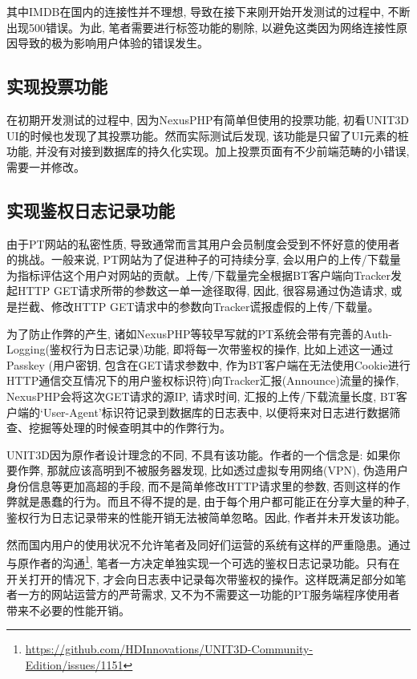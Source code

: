 其中IMDB在国内的连接性并不理想, 导致在接下来刚开始开发测试的过程中, 不断出现500错误。为此, 笔者需要进行标签功能的剔除, 以避免这类因为网络连接性原因导致的极为影响用户体验的错误发生。

\subsection{实现投票功能}

在初期开发测试的过程中, 因为NexusPHP有简单但使用的投票功能, 初看UNIT3D UI的时候也发现了其投票功能。然而实际测试后发现, 该功能是只留了UI元素的桩功能, 并没有对接到数据库的持久化实现。加上投票页面有不少前端范畴的小错误, 需要一并修改。

\subsection{实现鉴权日志记录功能}
\label{subsec:auth}

由于PT网站的私密性质, 导致通常而言其用户会员制度会受到不怀好意的使用者的挑战。一般来说, PT网站为了促进种子的可持续分享, 会以用户的上传/下载量为指标评估这个用户对网站的贡献。上传/下载量完全根据BT客户端向Tracker发起HTTP GET请求所带的参数这一单一途径取得, 因此, 很容易通过伪造请求, 或是拦截、修改HTTP GET请求中的参数向Tracker谎报虚假的上传/下载量。

为了防止作弊的产生, 诸如NexusPHP等较早写就的PT系统会带有完善的Auth-Logging(鉴权行为日志记录)功能, 即将每一次带鉴权的操作, 比如上述这一通过Passkey (用户密钥, 包含在GET请求参数中, 作为BT客户端在无法使用Cookie进行HTTP通信交互情况下的用户鉴权标识符)向Tracker汇报(Announce)流量的操作, NexusPHP会将这次GET请求的源IP, 请求时间, 汇报的上传/下载流量长度, BT客户端的`User-Agent'标识符记录到数据库的日志表中, 以便将来对日志进行数据筛查、挖掘等处理的时候查明其中的作弊行为。

UNIT3D因为原作者设计理念的不同, 不具有该功能。作者的一个信念是: 如果你要作弊, 那就应该高明到不被服务器发现, 比如透过虚拟专用网络(VPN), 伪造用户身份信息等更加高超的手段, 而不是简单修改HTTP请求里的参数, 否则这样的作弊就是愚蠢的行为。而且不得不提的是, 由于每个用户都可能正在分享大量的种子, 鉴权行为日志记录带来的性能开销无法被简单忽略。因此, 作者并未开发该功能。

然而国内用户的使用状况不允许笔者及同好们运营的系统有这样的严重隐患。通过与原作者的沟通\footnote{\url{https://github.com/HDInnovations/UNIT3D-Community-Edition/issues/1151}}, 笔者一方决定单独实现一个可选的鉴权日志记录功能。只有在开关打开的情况下, 才会向日志表中记录每次带鉴权的操作。这样既满足部分如笔者一方的网站运营方的严苛需求, 又不为不需要这一功能的PT服务端程序使用者带来不必要的性能开销。





